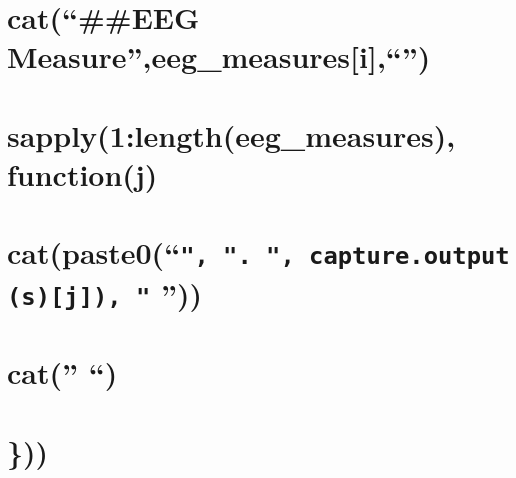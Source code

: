\documentclass[
]{article}
\begin{document}
\hypertarget{cateeg-measureeeg_measuresi}{%
\section{\texorpdfstring{cat(``\n\#\#EEG
Measure'',eeg\_measures{[}i{]},``\n'')}{cat(``\#\#EEG Measure'',eeg\_measures{[}i{]},``\,'')}}\label{cateeg-measureeeg_measuresi}}

\hypertarget{sapply1lengtheeg_measures-functionj}{%
\section{sapply(1:length(eeg\_measures),
function(j)}\label{sapply1lengtheeg_measures-functionj}}

\hypertarget{catpaste0-.-capture.outputsj}{%
\section{\texorpdfstring{cat(paste0(``\texttt{",\ ".\ ",\ capture.output(s){[}j{]}),\ "}
\n''))}{cat(paste0(``", ". ", capture.output(s){[}j{]}), " ''))}}\label{catpaste0-.-capture.outputsj}}

\hypertarget{cat}{%
\section{\texorpdfstring{cat('' \n``)}{cat('' ``)}}\label{cat}}

\hypertarget{section}{%
\section{\}))}\label{section}}
\end{document}
